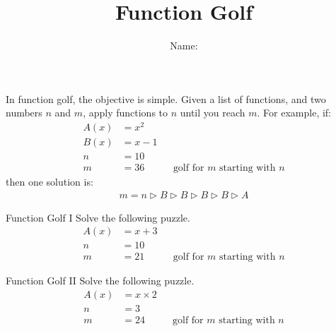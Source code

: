 \documentclass[12pt,letterpaper]{article}
\title{Function Golf}
\author{Name: \underline{\hspace{5cm}}}
\begin{document}
\maketitle

\thispagestyle{empty}

In function golf, the objective is simple. Given a list of functions, and two
numbers $n$ and $m$, apply functions to $n$ until you reach $m$. For example,
if:
\begin{align*}
 A(x) &= x^2 \\
 B(x) &= x-1 \\
 n &= 10 \\
 m &= 36 && \text{golf for $m$ starting with $n$}
\end{align*}
then one solution is:
\begin{align*}
 m = n \rhd B \rhd B \rhd B \rhd B \rhd A
\end{align*}

\begin{problem}{Function Golf I}
 Solve the following puzzle.
 \begin{align*}
  A(x) &= x + 3 \\
  n &= 10 \\
  m &= 21 && \text{golf for $m$ starting with $n$}
 \end{align*}
\end{problem}

\begin{problem}{Function Golf II}
 Solve the following puzzle.
 \begin{align*}
  A(x) &= x \times 2 \\
  n &= 3 \\
  m &= 24 && \text{golf for $m$ starting with $n$}
 \end{align*}
\end{problem}
\end{document}
